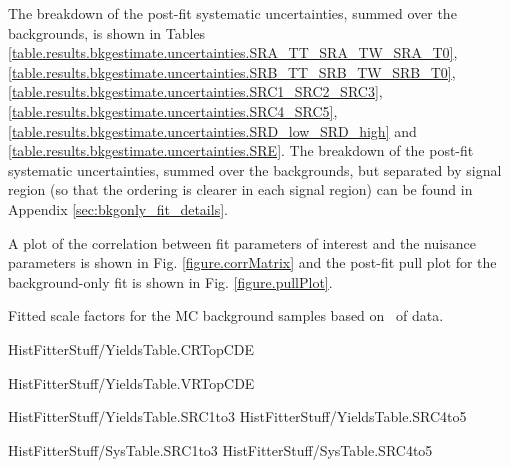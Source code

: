 The
breakdown of the post-fit systematic uncertainties, summed over the
backgrounds, is shown in Tables
\ref{table.results.bkgestimate.uncertainties.SRA_TT_SRA_TW_SRA_T0},
\ref{table.results.bkgestimate.uncertainties.SRB_TT_SRB_TW_SRB_T0},
\ref{table.results.bkgestimate.uncertainties.SRC1_SRC2_SRC3},
\ref{table.results.bkgestimate.uncertainties.SRC4_SRC5},
\ref{table.results.bkgestimate.uncertainties.SRD_low_SRD_high} and
\ref{table.results.bkgestimate.uncertainties.SRE}.
The breakdown of the post-fit systematic uncertainties, summed over
the backgrounds, but separated by signal region (so that the ordering
is clearer in each signal region) can be found in Appendix
\ref{sec:bkgonly_fit_details}. 

A plot of the correlation between fit parameters of interest and the
nuisance parameters is shown in Fig. \ref{figure.corrMatrix} and the
post-fit pull plot for the background-only fit is shown in
Fig. \ref{figure.pullPlot}.


\begin{table}
  \begin{center}
    
  \end{center}
  \caption{Fitted scale factors for the MC background samples based on
    \intlumi\ \ifb of data.}
  \label{table.scale.factors}
\end{table}

 {HistFitterStuff/YieldsTable.CRTopCDE}

 {HistFitterStuff/YieldsTable.VRTopCDE}

\clearpage

 {HistFitterStuff/YieldsTable.SRC1to3}
 {HistFitterStuff/YieldsTable.SRC4to5}

\clearpage

 {HistFitterStuff/SysTable.SRC1to3}
 {HistFitterStuff/SysTable.SRC4to5}

